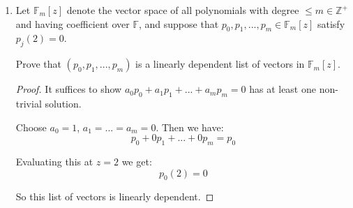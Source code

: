 \documentclass[12pt,letterpaper]{article}
\begin{document}
\begin{enumerate}
\begin{proof}
        Since $v_1$ comes from the basis of $V$, it is part of a linearly independent set of vectors.
        This means that $v_1$ does not have any components of the other vectors.

        Symbolically,
        \begin{align*}
          a_1v_1 + 0v_2 + 0v_3 + ... + 0v_n &= b_1v_1 + 0v_2 + 0v_3 + ... + 0v_n \\
          a_1v_1 &= b_1v_1 \\
          a_1v_1 - b_1v_1 &= 0 \\
          (a_1 - b_1)v_1 &= 0
        \end{align*}

        Now, since we know that $v_1$ is a basis for $U_1$ and part of the basis for $V$,
        we know that $v_1 \neq 0$, so we must have:

        \begin{align*}
          (a_1 - b_1)v_1 &= 0 \\
          a_1 - b_1 &= 0 \\
          a_1 &= b_1 \\
        \end{align*}

        And so, there is only one unique way to create $v_1$.

        Through similar reasoning, we can show that each $v_i$ is unique.

        Thus, since each $v_i \in V$ can be uniquely represented as $v_1 + v_2 + ... + v_n$,
        where $v_1 \in U_i, v_2 \in U_2, ..., v_n \in U_n$,

        \[V = U_1 \oplus U_2 \oplus \cdots \oplus U_n\]

      \end{proof}

    \item
      Let $\mathbb{F}_m[z]$ denote the vector space of all polynomials with degree
      $\le m \in \mathbb{Z}^+$ and having coefficient over $\mathbb{F}$,
      and suppose that $p_0, p_1, ..., p_m \in \mathbb{F}_m[z]$ satisfy
      $p_j(2) = 0$.
      
      Prove that $(p_0, p_1, ..., p_m)$
      is a linearly dependent list of vectors in $\mathbb{F}_m[z]$.

      \begin{proof}
        It suffices to show $a_0p_0 + a_1p_1 + ... + a_mp_m = 0$ has at least one non-trivial solution.

        Choose $a_0 = 1$, $a_1 = ... = a_m = 0$.
        Then we have:
        \[p_0 + 0p_1 + ... + 0p_m = p_0\]

        Evaluating this at $z = 2$ we get:
        \[p_0(2) = 0\]

        So this list of vectors is linearly dependent.
      \end{proof}
  \end{enumerate}
\end{document}
